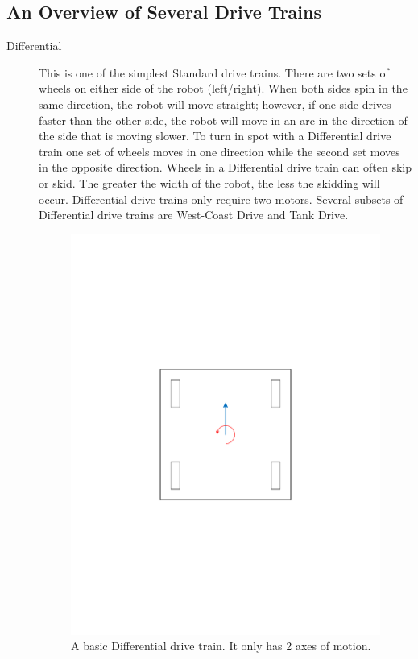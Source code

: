 \documentclass[a4paper]{article}
\begin{document}
\subsection{An Overview of Several Drive Trains}
\begin{description}
\item[Differential] This is one of the simplest Standard drive trains. There are two sets of wheels on either side of the robot (left/right). When both sides spin in the same direction, the robot will move straight; however, if one side drives faster than the other side, the robot will move in an arc in the direction of the side that is moving slower. To turn in spot with a Differential drive train one set of wheels moves in one direction while the second set moves in the opposite direction. Wheels in a Differential drive train can often skip or skid. The greater the width of the robot, the less the skidding will occur. Differential drive trains only require two motors. Several subsets of Differential drive trains are West-Coast Drive and Tank Drive. 

\begin{figure}[h]%
\begin{center}
\includegraphics[scale=0.6]{Diagrams/DifferentialDrive.pdf}
\end{center}
\caption{A basic Differential drive train. It only has 2 axes of motion.}%
\label{DiffDrive}%
\end{figure}


\end{description}
\end{document}
